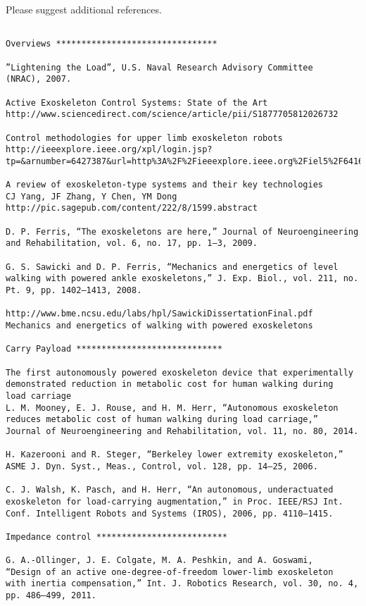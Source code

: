 \documentclass[letterpaper,12pt,fullpage]{article}
\begin{document}
Please suggest additional references.

\begin{verbatim}

Overviews ********************************

”Lightening the Load”, U.S. Naval Research Advisory Committee
(NRAC), 2007.

Active Exoskeleton Control Systems: State of the Art
http://www.sciencedirect.com/science/article/pii/S1877705812026732

Control methodologies for upper limb exoskeleton robots
http://ieeexplore.ieee.org/xpl/login.jsp?tp=&arnumber=6427387&url=http%3A%2F%2Fieeexplore.ieee.org%2Fiel5%2F6416132%2F6426928%2F06427387.pdf%3Farnumber%3D6427387

A review of exoskeleton-type systems and their key technologies
CJ Yang, JF Zhang, Y Chen, YM Dong
http://pic.sagepub.com/content/222/8/1599.abstract

D. P. Ferris, “The exoskeletons are here,” Journal of Neuroengineering
and Rehabilitation, vol. 6, no. 17, pp. 1–3, 2009.

G. S. Sawicki and D. P. Ferris, “Mechanics and energetics of level
walking with powered ankle exoskeletons,” J. Exp. Biol., vol. 211, no.
Pt. 9, pp. 1402–1413, 2008.

http://www.bme.ncsu.edu/labs/hpl/SawickiDissertationFinal.pdf
Mechanics and energetics of walking with powered exoskeletons

Carry Payload *****************************

The first autonomously powered exoskeleton device that experimentally
demonstrated reduction in metabolic cost for human walking during
load carriage
L. M. Mooney, E. J. Rouse, and H. M. Herr, “Autonomous exoskeleton
reduces metabolic cost of human walking during load carriage,”
Journal of Neuroengineering and Rehabilitation, vol. 11, no. 80, 2014.

H. Kazerooni and R. Steger, “Berkeley lower extremity exoskeleton,”
ASME J. Dyn. Syst., Meas., Control, vol. 128, pp. 14–25, 2006.

C. J. Walsh, K. Pasch, and H. Herr, “An autonomous, underactuated
exoskeleton for load-carrying augmentation,” in Proc. IEEE/RSJ Int.
Conf. Intelligent Robots and Systems (IROS), 2006, pp. 4110–1415.

Impedance control **************************

G. A.-Ollinger, J. E. Colgate, M. A. Peshkin, and A. Goswami,
“Design of an active one-degree-of-freedom lower-limb exoskeleton
with inertia compensation,” Int. J. Robotics Research, vol. 30, no. 4,
pp. 486–499, 2011.


\end{verbatim}
\end{document}
